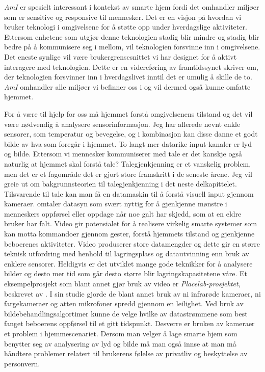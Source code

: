 \emph{AmI} er spesielt interessant i kontekst av smarte hjem fordi det omhandler miljøer som er sensitive og responsive til mennesker. Det er en visjon på hvordan vi bruker teknologi i omgivelsene for å støtte opp under hverdagslige aktiviteter. Ettersom enhetene som utgjør denne teknologien stadig blir mindre og stadig blir bedre på å kommunisere seg i mellom, vil teknologien forsvinne inn i omgivelsene. Det eneste synlige vil være brukergrensesnittet vi har designet for å aktivt interagere med teknologien. Dette er en videreføring av framtidssynet \citet{weiser91} skriver om, der teknologien forsvinner inn i hverdagslivet inntil det er umulig å skille de to. \emph{AmI} omhandler alle miljøer vi befinner oss i og vil dermed også kunne omfatte hjemmet.

For å være til hjelp for oss må hjemmet forstå omgivelsenens tilstand og det vil være nødvendig å analysere sensorinformasjon. Jeg har allerede nevnt enkle sensorer, som temperatur og bevegelse, og i kombinasjon kan disse danne et godt bilde av hva som foregår i hjemmet. To langt mer datarike input-kanaler er lyd og bilde. Ettersom vi mennesker kommuniserer med tale er det kanskje også naturlig at hjemmet skal forstå tale? Talegjenkjenning er et vanskelig problem, men det er et fagområde det er gjort store framskritt i de seneste årene. Jeg vil greie ut om bakgrunnsteorien til talegjenkjenning i det neste delkapittelet. Tilsvarende til tale kan man få en datamaskin til å forstå visuell input gjennom kameraer. \citet{augustonugent06} omtaler datasyn som svært nyttig for å gjenkjenne mønstre i menneskers oppførsel eller oppdage når noe galt har skjedd, som at en eldre bruker har falt. Video gir potensialet for å realisere virkelig smarte systemer som kan motta kommandoer gjennom gester, forstå hjemmets tilstand og gjenkjenne beboerenes aktiviteter. Video produserer store datamengder og dette gir en større teknisk utfordring med henhold til lagringsplass og datautvinning enn bruk av enklere sensorer. Heldigvis er det utviklet mange gode teknikker for å analysere bilder og desto mer tid som går desto større blir lagringskapasitetene våre. Et eksempelprosjekt som blant annet gjør bruk av video er \emph{Placelab-prosjektet}, beskrevet av \citet{placelab05}. I sin studie gjorde de blant annet bruk av ni infrarøde kameraer, ni fargekameraer og atten mikrofoner spredd gjennom en leilighet. Ved bruk av bildebehandlingsalgortimer kunne de velge hvilke av datastrømmene som best fanget beboerens oppførsel til et gitt tidspunkt. Desverre er bruken av kameraer et problem i hjemmescenariet. Dersom man velger å lage smarte hjem som benytter seg av analysering av lyd og bilde må man også innse at man må håndtere problemer relatert til brukerens følelse av privatliv og beskyttelse av personvern.

